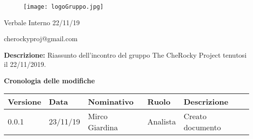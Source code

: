 \documentclass{article}
\begin{document}
    \begin{titlepage}
        \centering
        \vspace*{\fill}
        \begin{figure}[http]
            \centering
            \texttt{[image: logoGruppo.jpg]}
        \end{figure}
        
        \vspace*{0.5cm}
    
        \huge\bfseries\centerline{Verbale Interno 22/11/19}
        \small{cherockyproj@gmail.com}
        \vspace*{1cm}
        \normalsize{}
        
        \vspace*{\fill}
        {\bfseries Descrizione:}
        Riassunto dell’incontro del gruppo The CheRocky Project tenutosi il 22/11/2019.
    \end{titlepage}
    
    \vspace*{0.3cm}
    {\Large\bfseries Cronologia delle modifiche}
    \newline\newline
    \setlength{\tabcolsep}{18pt}
    \renewcommand{\arraystretch}{1.5}
    { \normalsize\mdseries
        \begin{tabular}{ |p{} p{1cm} p{} p{2cm} p{3cm}| } 
            \hline
            \rowcolor{custom}
            \bfseries\leavevmode\color{white} Versione & \bfseries\leavevmode\color{white} Data & \bfseries\leavevmode\color{white} Nominativo & \bfseries\leavevmode\color{white} Ruolo & \bfseries\leavevmode\color{white} Descrizione \\
            \hline\hline
            0.0.1 & 23/11/19 & Mirco Giardina & Analista & Creato documento \\ 
            \hline
        \end{tabular}
    }
    
\end{document}
